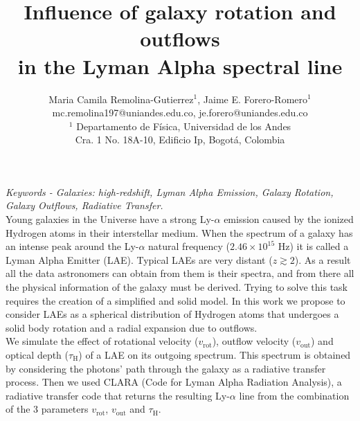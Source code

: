 \documentclass[11pt,a4paper]{article}
\begin{document}
\thispagestyle{empty}

\title{\textbf{Influence of galaxy rotation and outflows \\
			   in the Lyman Alpha spectral line}}
		
\author{Maria Camila Remolina-Gutierrez$^1$, Jaime E. Forero-Romero$^1$\\ \vspace{3mm}
	    mc.remolina197@uniandes.edu.co, \hspace{0.8mm} je.forero@uniandes.edu.co\\ 
		$^1$ Departamento de F\'{i}sica, Universidad de los Andes \\
		Cra. 1 No. 18A-10, Edificio Ip, Bogot\'a, Colombia}
\date{} %
\maketitle\thispagestyle{empty} %
\textit{Keywords - Galaxies: high-redshift, Lyman Alpha Emission, Galaxy Rotation, Galaxy Outflows, Radiative Transfer.}\\

Young galaxies in the Universe have a strong Ly-$\alpha$ emission caused by the ionized Hydrogen atoms in their interstellar medium. When the spectrum of a galaxy has an intense peak around the Ly-$\alpha$ natural frequency ($2.46\times 10^{15}$ Hz) it is called a Lyman Alpha Emitter (LAE). Typical LAEs are very distant ($z \gtrsim 2$). As a result all the data astronomers can obtain from them is their spectra, and from there all the physical information of the galaxy must be derived. Trying to solve this task requires the creation of a simplified and solid model. In this work we propose to consider LAEs as a spherical distribution of Hydrogen atoms that undergoes a solid body rotation and a radial expansion due to outflows. \\

We simulate the effect of rotational velocity ($v_{\mathrm{rot}}$), outflow velocity ($v_{\mathrm{out}}$) and optical depth ($\tau_{\mathrm{H}}$) of a LAE on its outgoing spectrum. This spectrum is obtained by considering the photons' path through the galaxy as a radiative transfer process. Then we used CLARA (Code for Lyman Alpha Radiation Analysis), a radiative transfer code that returns the resulting Ly-$\alpha$ line from the combination of the 3 parameters $v_{\mathrm{rot}}$, $v_{\mathrm{out}}$ and $\tau_{\mathrm{H}}$.\\
\end{document}

